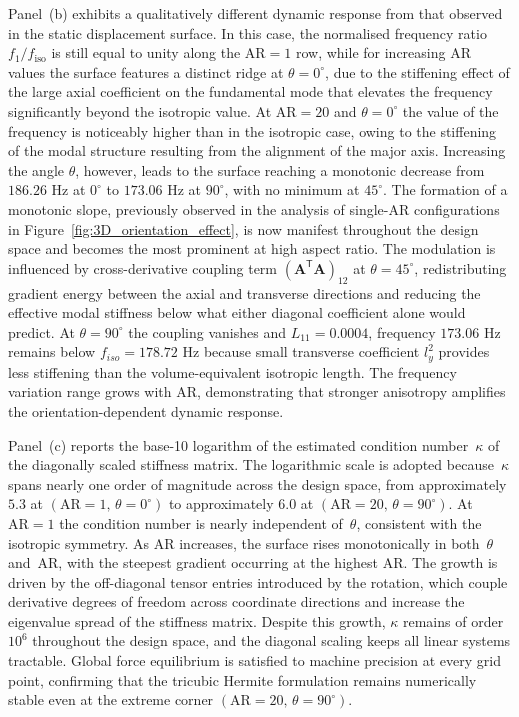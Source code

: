 \documentclass[final,3p,times,fleqn]{elsarticle}
\begin{document}
Panel~(b) exhibits a qualitatively different dynamic response from
that observed in the static displacement surface.
In this case, the normalised frequency ratio $f_{1}/f_{\mathrm{iso}}$
is still equal to unity along the $\mathrm{AR}=1$ row, while for
increasing $\mathrm{AR}$ values the surface features a distinct
ridge at $\theta = 0^{\circ}$, due to the stiffening effect of the
large axial coefficient on the fundamental mode that elevates the
frequency significantly beyond the isotropic value.
At $\mathrm{AR}=20$ and $\theta = 0^{\circ}$ the value of the
frequency is noticeably higher than in the isotropic case, owing to
the stiffening of the modal structure resulting from the alignment of the
major axis.
Increasing the angle $\theta$, however, leads to the surface reaching a
monotonic decrease from $186.26$ Hz at $0^{\circ}$ to $173.06$ Hz at $90^{\circ}$, with no minimum at $45^{\circ}$.
The formation of a monotonic slope, previously observed in the analysis of
single-$\mathrm{AR}$ configurations in Figure~\ref{fig:3D_orientation_effect},
is now manifest throughout the design space and becomes the most
prominent at high aspect ratio.
The modulation is influenced by cross-derivative coupling term $(\mathbf{A}^{\mathsf{T}}\mathbf{A})_{12}$ at
$\theta = 45^{\circ}$, redistributing gradient energy
between the axial and transverse directions and reducing the
effective modal stiffness below what either diagonal coefficient
alone would predict.
At $\theta=90^{\circ}$ the coupling vanishes and $L_{11}=0.0004$, frequency $173.06$ Hz remains below $f_{iso}=178.72$ Hz because small transverse coefficient $l_{y}^{2}$ provides less stiffening
than the volume-equivalent isotropic length.
The frequency variation range grows with AR,
demonstrating that stronger anisotropy amplifies the
orientation-dependent dynamic response.

Panel~(c) reports the base-10 logarithm of the estimated condition
number~$\kappa$ of the diagonally scaled stiffness matrix.
The logarithmic scale is adopted because~$\kappa$ spans nearly one
order of magnitude across the design space, from approximately
$5.3$ at $(\mathrm{AR}=1,\,\theta = 0^{\circ})$ to approximately
$6.0$ at $(\mathrm{AR}=20,\,\theta = 90^{\circ})$.
At $\mathrm{AR}=1$ the condition number is nearly independent
of~$\theta$, consistent with the isotropic symmetry.
As AR increases, the surface rises monotonically in both~$\theta$
and~AR, with the steepest gradient occurring at the highest AR.
The growth is driven by the off-diagonal tensor entries introduced
by the rotation, which couple derivative degrees of freedom across
coordinate directions and increase the eigenvalue spread of the
stiffness matrix.
Despite this growth, $\kappa$ remains of order~$10^{6}$ throughout
the design space, and the diagonal scaling keeps all linear systems
tractable.
Global force equilibrium is satisfied to machine precision at every
grid point, confirming that the tricubic Hermite formulation remains
numerically stable even at the extreme corner
$(\mathrm{AR}=20,\,\theta = 90^{\circ})$.
\end{document}
